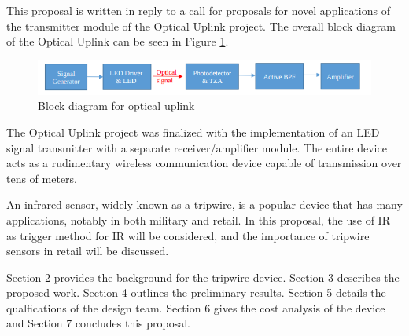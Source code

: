 




\noindent This proposal is written in reply to a call for proposals for novel applications of the transmitter module of the Optical Uplink project. The overall block diagram of the Optical Uplink can be seen in Figure \ref{fig:blockdiagram2}.


\begin{figure}[H]
    \centering
    \includegraphics[width=.9\textwidth ]{Introduction/blockdiagram}
    \caption{Block diagram for optical uplink}
    \label{fig:blockdiagram2}
\end{figure}

The Optical Uplink project was finalized with the implementation of an LED signal transmitter with a separate receiver/amplifier module. The entire device acts as a rudimentary wireless communication device capable of transmission over tens of meters.

An infrared sensor, widely known as a tripwire, is a popular device that has many applications, notably in both military and retail. In this proposal, the use of IR as trigger method for IR will be considered, and the importance of tripwire sensors in retail will be discussed.

Section 2 provides the background for the tripwire device. Section 3 describes the proposed work. Section 4 outlines the preliminary results. Section 5 details the qualfications of the design team. Section 6 gives the cost analysis of the device and Section 7 concludes this proposal.




